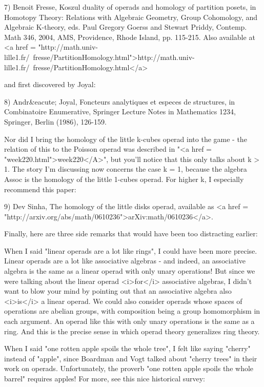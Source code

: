 7) Benoit Fresse, Koszul duality of operads and homology of
partition posets, in Homotopy Theory: Relations with Algebraic 
Geometry, Group Cohomology, and Algebraic K-theory, eds. 
Paul Gregory Goerss and Stewart Priddy, Contemp. Math 346, 
2004, AMS, Providence, Rhode Island, pp. 115-215.
Also available at <a href = "http://math.univ-lille1.fr/~fresse/PartitionHomology.html">http://math.univ-lille1.fr/~fresse/PartitionHomology.html</a>

and first discovered by Joyal:

8) Andr&eacute; Joyal, Foncteurs analytiques et especes de structures, in 
Combinatoire Enumerative, Springer Lecture Notes in Mathematics 1234, 
Springer, Berlin (1986), 126-159. 

Nor did I bring the homology of the little k-cubes operad into the
game - the relation of this to the Poisson operad was described in
"<a href = "week220.html">week220</A>", but you'll notice
that this only talks about k > 1.  The story I'm discussing now
concerns the case k = 1, because the algebra Assoc is the homology of
the little 1-cubes operad.  For higher k, I especially recommend this
paper:

9) Dev Sinha, The homology of the little disks operad, available as 
<a href = "http://arxiv.org/abs/math/0610236">arXiv:math/0610236</a>.

Finally, here are three side remarks that would have been too
distracting earlier:

When I said "linear operads are a lot like rings", I could have
been more precise.  Linear operads are a lot like associative algebras -
and indeed, an associative algebra is the same as a linear operad with
only unary operations!  But since we were talking about the linear
operad <i>for</i> associative algebras, I didn't want to blow your mind by
pointing out that an associative algebra also <i>is</i> a linear operad.
We could also consider operads whose spaces of operations are abelian
groups, with composition being a group homomorphism in each
argument.  An operad like this with only unary operations is the 
same as a ring.  And this is the precise sense in which operad theory
generalizes ring theory.

When I said "one rotten apple spoils the whole tree", I felt
like saying "cherry" instead of "apple", since
Boardman and Vogt talked about "cherry trees" in their work
on operads.  Unfortunately, the proverb "one rotten apple spoils
the whole barrel" requires apples!  For more, see this nice
historical survey:

